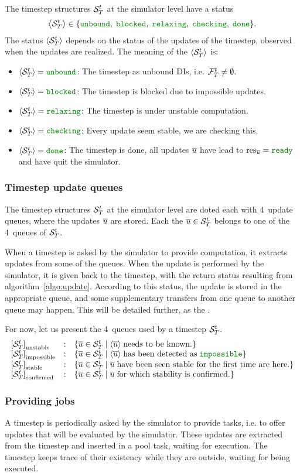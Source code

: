 The timestep structures ${{\cal S}}_{T}^{t}$ at the simulator level have a status $$\cxStatusSet.$$ The status $\left< {{\cal S}}_{T}^{t} \right>$ depends on the status of the updates of the timestep, observed when the updates are realized. The meaning of the $\left< {{\cal S}}_{T}^{t} \right>$ is:
\begin{itemize}
\item $\cxStatusTSUnbound$: The timestep as unbound DIs, i.e. ${{{\cal F}}_{T}^{t}} \neq {\emptyset}$.
\item $\cxStatusTSBlocked$: The timestep is blocked due to impossible updates.
\item $\cxStatusTSRelaxing$: The timestep is under unstable computation.
\item $\cxStatusTSChecking$: Every update seem stable, we are checking this.
\item $\cxStatusTSDone$: The timestep is done, all updates $\overline{u}$ have lead to $\cxResUpdtReady$ and have quit the simulator.
\end{itemize}


\subsubsection{Timestep update queues}

The timestep structures ${{\cal S}}_{T}^{t}$ at the simulator level are doted each with 4~update queues, where the updates $\overline{u}$ are stored. Each the ${\overline{u}} \in {{{\cal S}}_{T}^{t}}$ belongs to one of the 4~queues of ${{\cal S}}_{T}^{t}$.

When a timestep is asked by the simulator to provide computation, it extracts updates from some of the queues. When the update is performed by the simulator, it is given back to the timestep, with the return status resulting from algorithm~\ref{algo:update}. According to this status, the update is stored in the appropriate queue, and some supplementary transfers from one queue to another queue may happen. This will be detailed further, as the .

For now, let us present the 4~queues used by a timestep ${{\cal S}}_{T}^{t}$.
\begin{equation}
  \cxQDefs \nonumber
\end{equation}


\subsubsection{Providing jobs \label{sec:providejobs}}

A timestep is periodically asked by the simulator to provide tasks, i.e. to offer updates that will be evaluated by the simulator. These updates are extracted from the timestep and inserted in a pool task, waiting for execution. The timestep keeps trace of their existency while they are outside, waiting for being executed.

